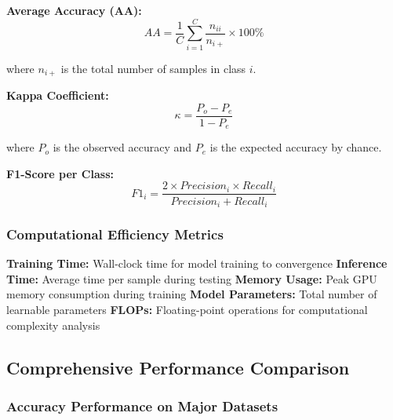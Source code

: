 \documentclass[journal]{IEEEtran}
\begin{document}
\textbf{Average Accuracy (AA):}
\begin{equation}
AA = \frac{1}{C} \sum_{i=1}^{C} \frac{n_{ii}}{n_{i+}} \times 100\%
\end{equation}

where $n_{i+}$ is the total number of samples in class $i$.

\textbf{Kappa Coefficient:}
\begin{equation}
\kappa = \frac{P_o - P_e}{1 - P_e}
\end{equation}

where $P_o$ is the observed accuracy and $P_e$ is the expected accuracy by chance.

\textbf{F1-Score per Class:}
\begin{equation}
F1_i = \frac{2 \times Precision_i \times Recall_i}{Precision_i + Recall_i}
\end{equation}

\subsubsection{Computational Efficiency Metrics}

\textbf{Training Time:} Wall-clock time for model training to convergence
\textbf{Inference Time:} Average time per sample during testing
\textbf{Memory Usage:} Peak GPU memory consumption during training
\textbf{Model Parameters:} Total number of learnable parameters
\textbf{FLOPs:} Floating-point operations for computational complexity analysis

\subsection{Comprehensive Performance Comparison}

\subsubsection{Accuracy Performance on Major Datasets}
\end{document}
